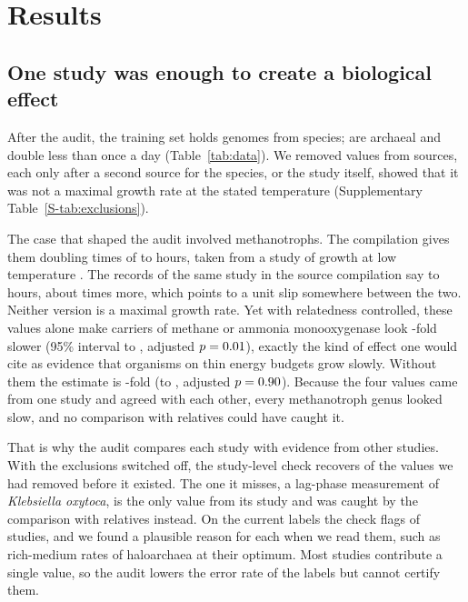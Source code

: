 \section{Results}





\subsection{One study was enough to create a biological effect}
After the audit, the training set holds \NGenomes genomes from \NSpecies species; \NArchaea are archaeal and \NSlow double
less than once a day (Table~\ref{tab:data}). We removed \NExcluded values from \NExcludedSourcesWord sources, each only after a
second source for the species, or the study itself, showed that it was not a maximal growth rate at the stated temperature
(Supplementary Table~\ref{S-tab:exclusions}).

The case that shaped the audit involved \NExcludedKevbrinaWord methanotrophs. The compilation gives them doubling times of
\KevLabelMin to \KevLabelMax hours, taken from a study of growth at low temperature \citep{kevbrina2001}. The records of the
same study in the source compilation say \KevRecordMin to \KevRecordMax hours, about \KevRatio times more, which points to a
unit slip somewhere between the two. Neither version is a maximal growth rate. Yet with relatedness controlled, these
\NExcludedKevbrinaWord values alone make carriers of methane or ammonia monooxygenase look \KevFoldWith-fold slower (95\%
interval \KevLowWith to \KevHighWith, adjusted $p=0.01$), exactly the kind of effect one would cite as evidence that
organisms on thin energy budgets grow slowly. Without them the estimate is \KevFoldWithout-fold (\KevLowWithout to
\KevHighWithout, adjusted $p=0.90$). Because the four values came from one study and agreed with each other, every
methanotroph genus looked slow, and no comparison with relatives could have caught it.

That is why the audit compares each study with evidence from other studies. With the exclusions switched off, the
study-level check recovers \PosCtrlCaughtWord of the \PosCtrlNWord values we had removed before it existed. The one it misses,
a lag-phase measurement of \textit{Klebsiella oxytoca}, is the only value from its study and was caught by the comparison with
relatives instead. On the current labels the check flags \NStudiesFlagged of \NStudiesCompared studies, and we found a
plausible reason for each when we read them, such as rich-medium rates of haloarchaea at their optimum. Most studies contribute
a single value, so the audit lowers the error rate of the labels but cannot certify them.

